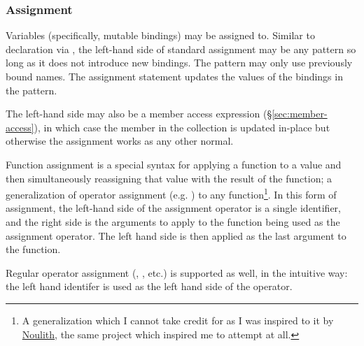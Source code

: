 \subsubsection{Assignment}

Variables (specifically, mutable bindings) may be assigned to. Similar to
declaration via , the left-hand side of standard assignment may be
any pattern so long as it does not introduce new bindings. The pattern may only
use previously bound names. The assignment statement updates the values of the
bindings in the pattern.

The left-hand side may also be a member access expression (\S\ref{sec:member-access}),
in which case the member in the collection is updated in-place but otherwise the
assignment works as any other normal.

Function assignment is a special syntax for applying a function to a value and
then simultaneously reassigning that value with the result of the function; a
generalization of operator assignment (e.g. \op{+=}) to any function\footnote{A
generalization which I cannot take credit for as I was inspired to it by
\href{https://github.com/betaveros/noulith}{Noulith}, the same project
which inspired me to attempt \Trilogy{} at all.}. In this form
of assignment, the left-hand side of the assignment operator is a single identifier,
and the right side is the arguments to apply to the function being used as the
assignment operator. The left hand side is then applied as the last argument to
the function.

Regular operator assignment (\op{+=}, \op{-=}, etc.) is supported as well, in the
intuitive way: the left hand identifer is used as the left hand side of the operator.

